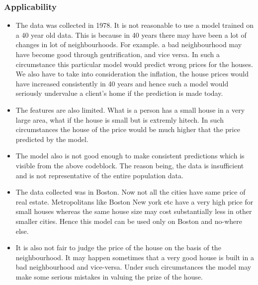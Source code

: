 \documentclass[11pt]{article}
\providecommand{\tightlist}{%
      \setlength{\itemsep}{0pt}\setlength{\parskip}{0pt}}
\begin{document}
    \subsubsection{Applicability}\label{applicability}

    \begin{itemize}
\tightlist
\item
  The data was collected in 1978. It is not reasonable to use a model
  trained on a 40 year old data. This is because in 40 years there may
  have been a lot of changes in lot of neighbourhoods. For example. a
  bad neighbourhood may have become good through gentrification, and
  vice versa. In such a circumstance this particular model would predict
  wrong prices for the houses. We also have to take into consideration
  the inflation, the house prices would have increased consistently in
  40 years and hence such a model would seriously undervalue a client's
  home if the prediction is made today.
\item
  The features are also limited. What is a person has a small house in a
  very large area, what if the house is small but is extremly hitech. In
  such circumstances the house of the price would be much higher that
  the price predicted by the model.
\item
  The model also is not good enough to make consistent predictions which
  is visible from the above codeblock. The reason being, the data is
  insufficient and is not representative of the entire population data.
\item
  The data collected was in Boston. Now not all the cities have same
  price of real estate. Metropolitans like Boston New york etc have a
  very high price for small houses whereas the same house size may cost
  substantially less in other smaller cities. Hence this model can be
  used only on Boston and no-where else.
\item
  It is also not fair to judge the price of the house on the basis of
  the neighbourhood. It may happen sometimes that a very good house is
  built in a bad neighbourhood and vice-versa. Under such circumstances
  the model may make some serious mistakes in valuing the prize of the
  house.
\end{itemize}


    
    
    
    
\end{document}
